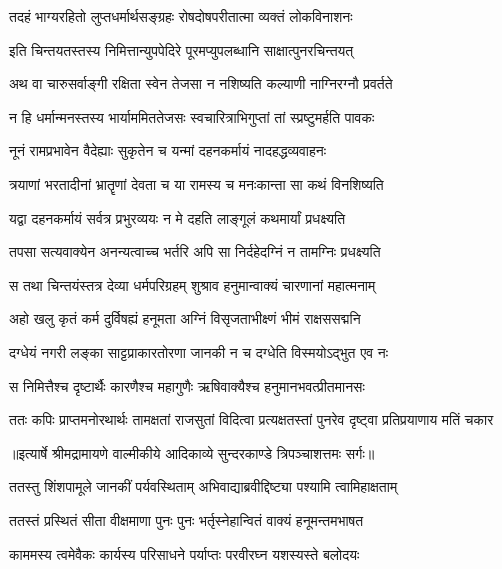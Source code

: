 \twolineshloka
{तदहं भाग्यरहितो लुप्तधर्मार्थसङ्ग्रहः}
{रोषदोषपरीतात्मा व्यक्तं लोकविनाशनः} %

\twolineshloka
{इति चिन्तयतस्तस्य निमित्तान्युपपेदिरे}
{पूरमप्युपलब्धानि साक्षात्पुनरचिन्तयत्} %

\twolineshloka
{अथ वा चारुसर्वाङ्गी रक्षिता स्वेन तेजसा}
{न नशिष्यति कल्याणी नाग्निरग्नौ प्रवर्तते} %

\twolineshloka
{न हि धर्मान्मनस्तस्य भार्याममिततेजसः}
{स्वचारित्राभिगुप्तां तां स्प्रष्टुमर्हति पावकः} %

\twolineshloka
{नूनं रामप्रभावेन वैदेह्याः सुकृतेन च}
{यन्मां दहनकर्मायं नादहद्धव्यवाहनः} %

\twolineshloka
{त्रयाणां भरतादीनां भ्रातॄणां देवता च या}
{रामस्य च मनःकान्ता सा कथं विनशिष्यति} %

\twolineshloka
{यद्वा दहनकर्मायं सर्वत्र प्रभुरव्ययः}
{न मे दहति लाङ्गूलं कथमार्यां प्रधक्ष्यति} %

\twolineshloka
{तपसा सत्यवाक्येन अनन्यत्वाच्च भर्तरि}
{अपि सा निर्दहेदग्निं न तामग्निः प्रधक्ष्यति} %

\twolineshloka
{स तथा चिन्तयंस्तत्र देव्या धर्मपरिग्रहम्}
{शुश्राव हनुमान्वाक्यं चारणानां महात्मनाम्} %

\twolineshloka
{अहो खलु कृतं कर्म दुर्विषह्यं हनूमता}
{अग्निं विसृजताभीक्ष्णं भीमं राक्षससद्मनि} %

\twolineshloka
{दग्धेयं नगरी लङ्का साट्टप्राकारतोरणा}
{जानकी न च दग्धेति विस्मयोऽद्भुत एव नः} %

\twolineshloka
{स निमित्तैश्च दृष्टार्थैः कारणैश्च महागुणैः}
{ऋषिवाक्यैश्च हनुमानभवत्प्रीतमानसः} %

\fourlineindentedshloka
{ततः कपिः प्राप्तमनोरथार्थः}
{तामक्षतां राजसुतां विदित्वा}
{प्रत्यक्षतस्तां पुनरेव दृष्ट्वा}
{प्रतिप्रयाणाय मतिं चकार} %


{॥इत्यार्षे श्रीमद्रामायणे वाल्मीकीये आदिकाव्ये सुन्दरकाण्डे त्रिपञ्चाशत्तमः सर्गः॥}


\twolineshloka
{ततस्तु शिंशपामूले जानकीं पर्यवस्थिताम्}
{अभिवाद्याब्रवीद्दिष्ट्या पश्यामि त्वामिहाक्षताम्} %

\twolineshloka
{ततस्तं प्रस्थितं सीता वीक्षमाणा पुनः पुनः}
{भर्तृस्नेहान्वितं वाक्यं हनूमन्तमभाषत} %

\twolineshloka
{काममस्य त्वमेवैकः कार्यस्य परिसाधने}
{पर्याप्तः परवीरघ्न यशस्यस्ते बलोदयः} %

